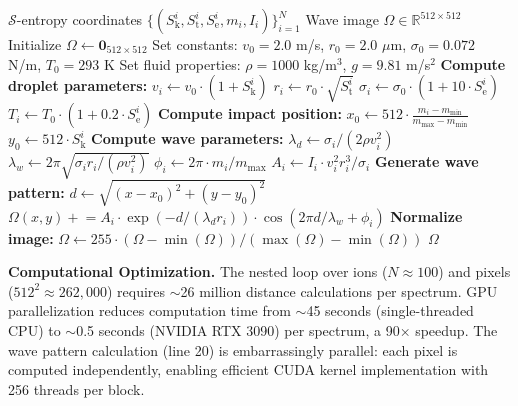 \documentclass[11pt,twocolumn]{article}
\newcommand{\sentropy}{$\mathcal{S}$-entropy}
\newcommand{\Sk}{S_{\text{k}}}
\newcommand{\St}{S_{\text{t}}}
\newcommand{\Se}{S_{\text{e}}}
\begin{document}
\begin{algorithm}[h]
\caption{Thermodynamic Droplet Image Generation}
\label{alg:droplet}
\begin{algorithmic}[1]
\Require \sentropy{} coordinates $\{(\Sk^i, \St^i, \Se^i, m_i, I_i)\}_{i=1}^N$
\Ensure Wave image $\Omega \in \mathbb{R}^{512 \times 512}$
\State Initialize $\Omega \gets \mathbf{0}_{512 \times 512}$ 
\State Set constants: $v_0 = 2.0$ m/s, $r_0 = 2.0$ $\mu$m, $\sigma_0 = 0.072$ N/m, $T_0 = 293$ K
\State Set fluid properties: $\rho = 1000$ kg/m$^3$, $g = 9.81$ m/s$^2$
    \State \textbf{Compute droplet parameters:}
    \State $v_i \gets v_0 \cdot (1 + \Sk^i)$ 
    \State $r_i \gets r_0 \cdot \sqrt{\St^i}$ 
    \State $\sigma_i \gets \sigma_0 \cdot (1 + 10 \cdot \Se^i)$ 
    \State $T_i \gets T_0 \cdot (1 + 0.2 \cdot \Se^i)$ 
    \State \textbf{Compute impact position:}
    \State $x_0 \gets 512 \cdot \frac{m_i - m_{\min}}{m_{\max} - m_{\min}}$ 
    \State $y_0 \gets 512 \cdot \Sk^i$ 
    \State \textbf{Compute wave parameters:}
    \State $\lambda_d \gets \sigma_i / (2 \rho v_i^2)$ 
    \State $\lambda_w \gets 2\pi \sqrt{\sigma_i r_i / (\rho v_i^2)}$ 
    \State $\phi_i \gets 2\pi \cdot m_i / m_{\max}$ 
    \State $A_i \gets I_i \cdot v_i^2 r_i^3 / \sigma_i$ 
    \State \textbf{Generate wave pattern:}
        \State $d \gets \sqrt{(x - x_0)^2 + (y - y_0)^2}$ 
        \State $\Omega(x, y) \mathrel{+}= A_i \cdot \exp(-d / (\lambda_d r_i)) \cdot \cos(2\pi d / \lambda_w + \phi_i)$
    \EndFor
\EndFor
\State \textbf{Normalize image:}
\State $\Omega \gets 255 \cdot (\Omega - \min(\Omega)) / (\max(\Omega) - \min(\Omega))$ 
\State \Return $\Omega$
\end{algorithmic}
\end{algorithm}

\textbf{Computational Optimization.} The nested loop over ions ($N \approx 100$) and pixels ($512^2 \approx 262,000$) requires $\sim$26 million distance calculations per spectrum. GPU parallelization reduces computation time from $\sim$45 seconds (single-threaded CPU) to $\sim$0.5 seconds (NVIDIA RTX 3090) per spectrum, a 90× speedup. The wave pattern calculation (line 20) is embarrassingly parallel: each pixel is computed independently, enabling efficient CUDA kernel implementation with 256 threads per block.
\end{document}
